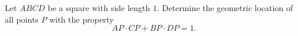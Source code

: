 Let $ABCD$ be a square with side length $1$.
Determine the geometric location of all points $P$ with the property 
$$AP \cdot CP + BP \cdot DP = 1.$$
